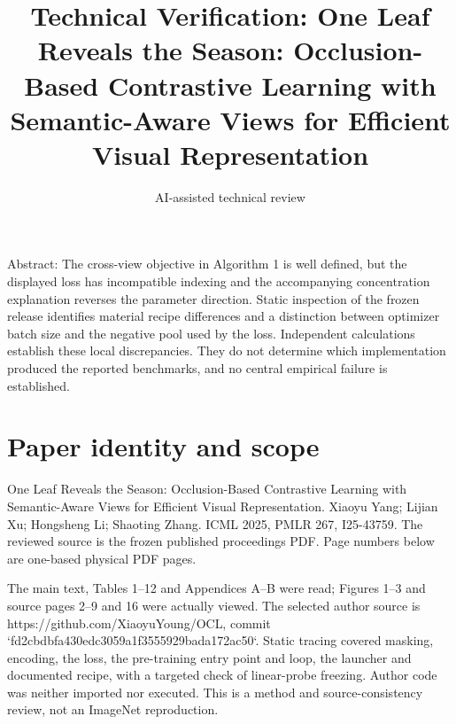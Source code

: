 \documentclass[10pt]{article}
\title{Technical Verification: One Leaf Reveals the Season: Occlusion-Based Contrastive Learning with Semantic-Aware Views for Efficient Visual Representation}
\author{AI-assisted technical review}
\date{}
\begin{document}
\maketitle
Abstract: The cross-view objective in Algorithm 1 is well defined, but the displayed loss has incompatible indexing and the accompanying concentration explanation reverses the parameter direction. Static inspection of the frozen release identifies material recipe differences and a distinction between optimizer batch size and the negative pool used by the loss. Independent calculations establish these local discrepancies. They do not determine which implementation produced the reported benchmarks, and no central empirical failure is established.\par
\section*{Paper identity and scope}
One Leaf Reveals the Season: Occlusion-Based Contrastive Learning with Semantic-Aware Views for Efficient Visual Representation. Xiaoyu Yang; Lijian Xu; Hongsheng Li; Shaoting Zhang. ICML 2025, PMLR 267, I25-43759. The reviewed source is the frozen published proceedings PDF. Page numbers below are one-based physical PDF pages.\par
The main text, Tables 1–12 and Appendices A–B were read; Figures 1–3 and source pages 2–9 and 16 were actually viewed. The selected author source is https://github.com/XiaoyuYoung/OCL, commit `fd2cbdbfa430edc3059a1f3555929bada172ac50`. Static tracing covered masking, encoding, the loss, the pre-training entry point and loop, the launcher and documented recipe, with a targeted check of linear-probe freezing. Author code was neither imported nor executed. This is a method and source-consistency review, not an ImageNet reproduction.\par
\end{document}
